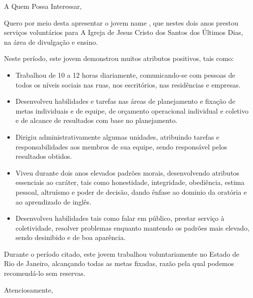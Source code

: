 \documentclass[12pt]{letter}
\begin{document}
\begin{letter}{A Quem Possa Interessar,}

\date{ {{ date }} }
\opening{}

Quero por meio desta apresentar o jovem {{ name }}, que nestes dois anos prestou servi\c cos volunt\'arios para A Igreja de Jesus Cristo dos Santos dos \'Ultimos Dias, na \'area de divulga\c c\~ao e ensino.

Neste per\'iodo, este jovem demonstrou muitos atributos positivos, tais como:

\begin{itemize}
	\item Trabalhou de 10 a 12 horas diariamente, comunicando-se com pessoas de todos os n\'iveis sociais nas ruas, nos escrit\'orios, nas resid\^encias e empresas.
	\item Desenvolveu habilidades e tarefas nas \'areas de planejamento e fixa\c c\~ao de metas individuais e de equipe, de or\c camento operacional individual e coletivo e de alcance de resultados com base no planejamento.
	\item Dirigiu administrativamente algumas unidades, atribuindo tarefas e responsabilidades aos membros de sua equipe, sendo respons\'avel pelos resultados obtidos.
	\item Viveu durante dois anos elevados padr\~oes morais, desenvolvendo atributos essenciais ao car\'ater, tais como honestidade, integridade, obedi\^encia, estima pessoal, altru\'ismo e poder de decis\~ao, dando \^enfase ao dominio da orat\'oria e ao aprendizado de ingl\^es.
	\item Desenvolveu habilidades tais como falar em p\'ublico, prestar servi\c co \`a coletividade, resolver problemas enquanto mantendo os padr\~oes mais elevado, sendo desinibido e de boa apar\^encia.
\end{itemize}

Durante o per\'iodo citado, este jovem trabalhou voluntariamente no Estado de Rio de Janeiro, alcan\c cando todas as metas fixadas, raz\~ao pela qual podemos recomend\'a-lo sem reservas.

\closing{Atenciosamente,}
\end{letter}
\end{document}
